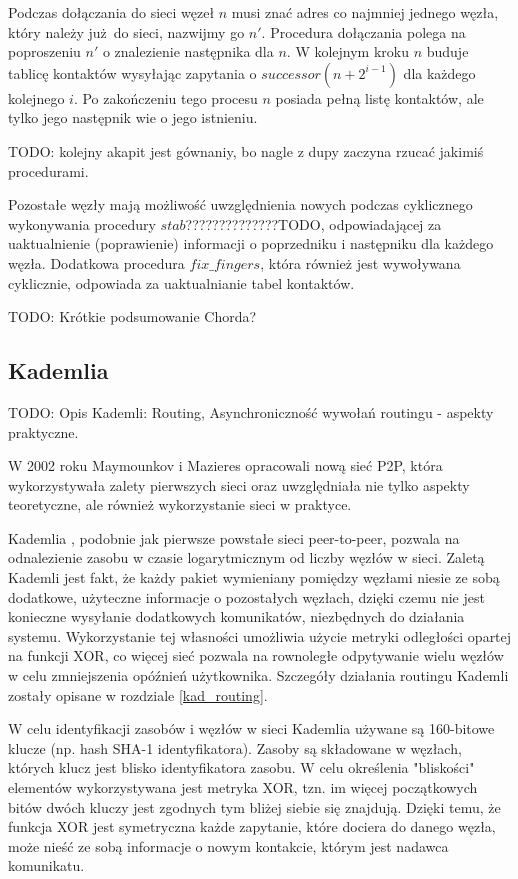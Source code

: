 \documentclass[a4paper,11pt]{scrartcl}
\begin{document}
Podczas dołączania do sieci węzeł $n$ musi znać adres co najmniej jednego węzła, który należy już do sieci, nazwijmy go $n'$. Procedura dołączania polega na poproszeniu $n'$ o znalezienie następnika dla $n$. W kolejnym kroku $n$ buduje tablicę kontaktów wysyłając zapytania o $successor(n + 2^{i-1})$ dla każdego kolejnego $i$. Po zakończeniu tego procesu $n$ posiada pełną listę kontaktów, ale tylko jego następnik wie o jego istnieniu.


TODO: kolejny akapit jest gównaniy, bo nagle z dupy zaczyna rzucać jakimiś procedurami.

Pozostałe węzły mają możliwość uwzględnienia nowych podczas cyklicznego wykonywania procedury $stab$??????????????TODO, odpowiadającej za uaktualnienie (poprawienie) informacji o poprzedniku i następniku dla każdego węzła. Dodatkowa procedura $fix\_fingers$, która również jest wywoływana cyklicznie, odpowiada za uaktualnianie tabel kontaktów.

TODO: Krótkie podsumowanie Chorda?


\subsection{Kademlia}
TODO: Opis Kademli\cite{maymounkov2002kademlia}: Routing, Asynchroniczność wywołań routingu - aspekty praktyczne.

W 2002 roku Maymounkov i Mazieres opracowali nową sieć P2P, która wykorzystywała zalety pierwszych sieci oraz uwzględniała nie tylko aspekty teoretyczne, ale również wykorzystanie sieci w praktyce.

Kademlia \cite{maymounkov2002kademlia}, podobnie jak pierwsze powstałe sieci peer-to-peer, pozwala na odnalezienie zasobu w czasie logarytmicznym od liczby węzłów w sieci. Zaletą Kademli jest fakt, że każdy pakiet wymieniany pomiędzy węzłami niesie ze sobą dodatkowe, użyteczne informacje o pozostałych węzłach, dzięki czemu nie jest konieczne wysyłanie dodatkowych komunikatów, niezbędnych do działania systemu. Wykorzystanie tej własności umożliwia użycie metryki odległości opartej na funkcji XOR, co więcej sieć pozwala na rownoległe odpytywanie wielu węzłów w celu zmniejszenia opóźnień użytkownika. Szczegóły działania routingu Kademli zostały opisane w rozdziale \ref{kad_routing}.

W celu identyfikacji zasobów i węzłów w sieci Kademlia używane są 160-bitowe klucze (np. hash SHA-1 identyfikatora). Zasoby są składowane w węzłach, których klucz jest blisko identyfikatora zasobu. W celu określenia "bliskości" elementów wykorzystywana jest metryka XOR, tzn. im więcej początkowych bitów dwóch kluczy jest zgodnych tym bliżej siebie się znajdują. Dzięki temu, że funkcja XOR jest symetryczna każde zapytanie, które dociera do danego węzła, może nieść ze sobą informacje o nowym kontakcie, którym jest nadawca komunikatu.
\end{document}
